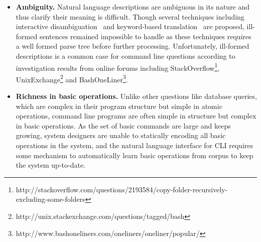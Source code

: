 \begin{itemize}
\item \textbf{Ambiguity.} Natural language descriptions are ambiguous in its nature and thus clarify their meaning is difficult. Though several techniques including interactive disambiguation~\cite{DBLP:journals/pvldb/LiJ14} and keyword-based translation~\cite{DBLP:conf/sigmod/GulwaniM14} are proposed, ill-formed sentences remained impossible to handle as these techniques requires a well formed parse tree before further processing. Unfortunately, ill-formed descriptions is a common case for command line questions according to investigation results from online forums including StackOverflow\footnote{http://stackoverflow.com/questions/2193584/copy-folder-recursively-excluding-some-folders}, UnixExchange\footnote{http://unix.stackexchange.com/questions/tagged/bash} and BashOneLiner\footnote{http://www.bashoneliners.com/oneliners/oneliner/popular/}.
\item \textbf{Richness in basic operations.} Unlike other questions like database queries, which are complex in their program structure but simple in atomic operations, command line programs are often simple in structure but complex in basic operations. As the set of basic commands are large and keeps growing, system designers are unable to statically encoding all basic operations in the system, and the natural language interface for CLI requires some mechanism to automatically learn basic operations from corpus to keep the system up-to-date.
\end{itemize}

